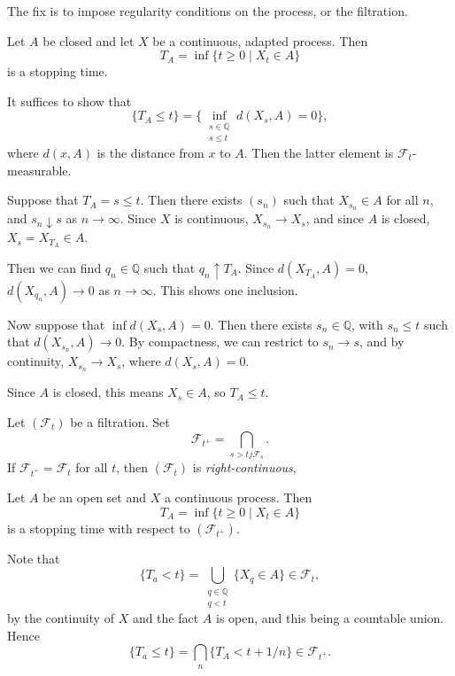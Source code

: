 \documentclass[12pt]{article}
\begin{document}
The fix is to impose regularity conditions on the process, or the filtration.

\begin{proposition}
	Let $A$ be closed and let $X$ be a continuous, adapted process. Then
	\[
		T_A= \inf \{t \geq 0 \mid X_t \in A\}
	\]
	is a stopping time.
\end{proposition}

\begin{proofbox}
	It suffices to show that
	\[
		\{T_A \leq t\} = \{ \inf_{\substack{s \in \mathbb{Q} \\ s \leq t}} d(X_s, A) = 0\},
	\]
	where $d(x, A)$ is the distance from $x$ to $A$. Then the latter element is $\mathcal{F}_t$-measurable.

	Suppose that $T_A = s \leq t$. Then there exists $(s_n)$ such that $X_{s_n} \in A$ for all $n$, and $s_ n\downarrow s$ as $n \to \infty$. Since $X$ is continuous, $X_{s_n} \to X_s$, and since $A$ is closed, $X_s = X_{T_A} \in A$.

	Then we can find $q_n \in \mathbb{Q}$ such that $q_n \uparrow T_A$. Since $d(X_{T_A}, A) = 0$, $d(X_{q_n}, A) \to 0$ as $n \to \infty$. This shows one inclusion.

	Now suppose that $\inf d(X_s, A) = 0$. Then there exists $s_n \in \mathbb{Q}$, with $s_n \leq t$ such that $d(X_{s_n}, A) \to 0$. By compactness, we can restrict to $s_n \to s$, and by continuity, $X_{s_n} \to X_s$, where $d(X_s, A) = 0$.

	Since $A$ is closed, this means $X_s \in A$, so $T_A \leq t$.
\end{proofbox}

\begin{definition}
	Let $(\mathcal{F}_t)$ be a filtration. Set
	\[
	\mathcal{F}_{t^+} = \bigcap_{s > tj \mathcal{F}_s}.
	\]
	If $\mathcal{F}_{t^+} = \mathcal{F}_t$ for all $t$, then $(\mathcal{F}_t)$ is \emph{right-continuous},
\end{definition}


\begin{proposition}
	Let $A$ be an open set and $X$ a continuous process. Then
	\[
		T_A = \inf\{ t \geq 0 \mid X_t \in A\}
	\]
	is a stopping time with respect to $(\mathcal{F}_{t^+})$.
\end{proposition}

\begin{proofbox}
	Note that
	\[
		\{T_a < t\} = \bigcup_{\substack{q \in \mathbb{Q} \\ q< t}}\{X_q \in A\} \in \mathcal{F}_t,
	\]
	by the continuity of $X$ and the fact $A$ is open, and this being a countable union. Hence
	\[
		\{T_a \leq t\} = \bigcap_n \{T_A < t + 1/n\} \in \mathcal{F}_{t^{+}}.
	\]
\end{proofbox}
\end{document}
